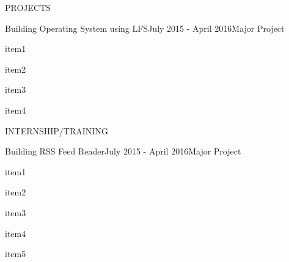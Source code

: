 \documentclass{resume} %
\begin{document}
\begin{rSection}{PROJECTS}

  \begin{rSubsection}
    {Building Operating System using LFS}{July 2015 - April 2016}{Major Project}{}
  \item item1
  \item item2
  \item item3
  \item item4
 
  \end{rSubsection} 

\end{rSection} 


\begin{rSection}{INTERNSHIP/TRAINING}

  \begin{rSubsection}
    {Building RSS Feed Reader}{July 2015 - April 2016}{Major Project}{}
  \item item1
  \item item2
  \item item3
  \item item4
  \item item5
 
  \end{rSubsection} 

\end{rSection} 


\end{document}
